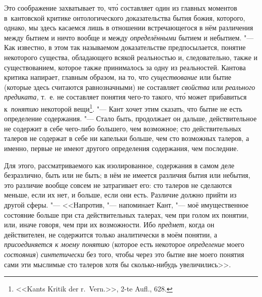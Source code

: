 Это соображение захватывает то, чт\'{о} составляет один из главных моментов
в~кантовской критике онтологического доказательства бытия божия, которого,
однако, мы здесь касаемся лишь в отношении встречающегося в нём различения
между бытием и ничто вообще и между {\em определёнными} бытием и небытием. "---
Как известно, в этом так называемом доказательстве предпосылается, понятие
некоторого существа, обладающего всякой реальностью и, следовательно, также и
существованием, которое также принималось за одну из реальностей. Кантова
критика напирает, главным образом, на то, что {\em существование} или бытие
(которые здесь считаются равнозначными) не составляет {\em свойства} или {\em
реального предиката,} т.~е. не составляет понятия чего-то такого, чт\'{о} может
прибавиться к~{\em понятию} некоторой вещи\footnote{<<Kants Kritik der
r.~Vern.>>, 2-te Aufl., 628.}. "--- Кант хочет этим сказать, что бытие не есть
определение содержания. "--- Стало быть, продолжает он дальше, действительное
не содержит в себе чего-либо большего, чем возможное; сто действительных
талеров не содержат в себе ни капельки больше, чем сто возможных талеров, а
именно, первые не имеют другого определения содержания, чем последние.

Для этого, рассматриваемого как изолированное, содержания в самом деле
безразлично, быть или не быть; в нём не имеется различия бытия или небытия, это
различие вообще совсем не затрагивает его: сто талеров не сделаются меньше,
если их нет, и больше, если они есть. Различие должно прийти из другой сферы.
"--- <<Напротив, "--- напоминает Кант, "--- моё имущественное состояние больше
при ста действительных талерах, чем при голом их понятии, или, иначе говоря,
чем при их возможности. Ибо {\em предмет,} когда он действителен, не содержится
только аналитически в моём понятии, а {\em присоединяется к моему понятию}
(которое есть некоторое {\em определение} моего {\em состояния})
{\em синтетически} без того, чтобы через это бытие вне моего понятия сами эти
мыслимые сто талеров хотя бы сколько-нибудь увеличились>>.

